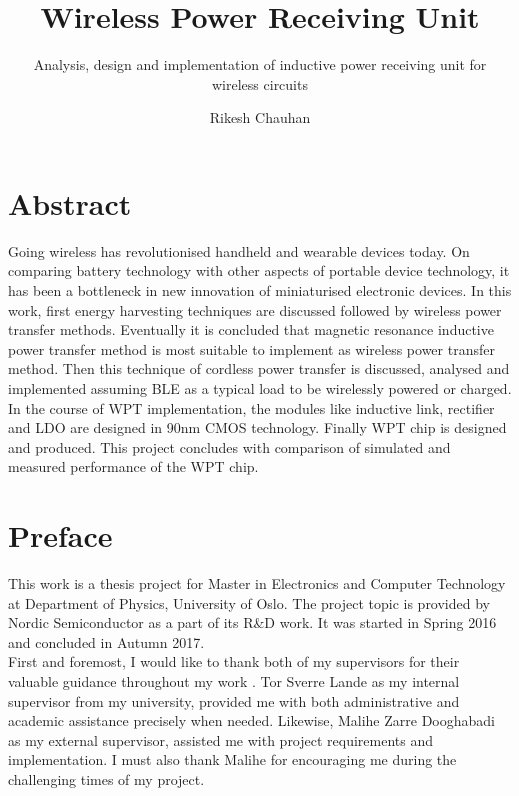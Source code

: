 \documentclass[12pt,a4paper,UKenglish]{report}
\title{Wireless Power Receiving Unit}
\subtitle{Analysis, design and implementation of inductive power receiving unit for wireless circuits}
\author{Rikesh Chauhan}
\makeatletter
\newcommand\frontmatter{%
    \cleardoublepage
  \pagenumbering{roman}}
\makeatother
\begin{document}

\duoforside[program={Electronics and Computer Technology},
  dept={Department of Physics},
  option={Microelectronics},
  image={DUO_UiO_segl.png},
  long]

\frontmatter{}


\chapter*{Abstract}
Going wireless has revolutionised handheld and wearable devices today. On comparing battery technology with other aspects of portable device technology, it has 
been a bottleneck in new innovation of miniaturised electronic devices.  In this work, first energy harvesting techniques are discussed followed by wireless power 
transfer methods. Eventually it is concluded that magnetic resonance inductive power transfer method is most suitable to implement as wireless power transfer 
method. Then this technique of cordless  power transfer is discussed, analysed and implemented assuming BLE as a typical load to be wirelessly powered or 
charged.  In the course of WPT implementation, the modules like inductive link, rectifier and LDO are designed in 90nm CMOS technology. Finally WPT chip 
is designed and produced. This project concludes with comparison of simulated and measured performance of the WPT chip.

\chapter*{Preface}
This work is a thesis project for Master in Electronics and Computer Technology at Department of Physics, University of Oslo. The project topic is provided by Nordic Semiconductor 
as a part of its R\&D work. It was started in Spring 2016 and concluded in Autumn 2017. \\

First and foremost, I would like to thank both of my supervisors for their valuable guidance throughout my work . Tor Sverre Lande as my internal supervisor from my university, provided me with both administrative and academic assistance precisely when needed. Likewise, Malihe Zarre Dooghabadi as my external 
supervisor, assisted me with project requirements and implementation. I must also thank Malihe for encouraging me during the challenging times of my project. \\
\end{document}
